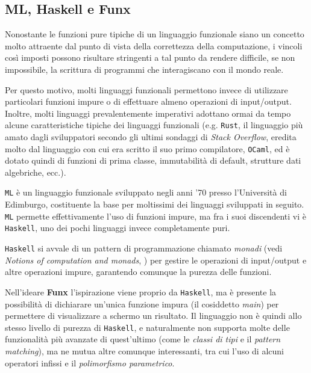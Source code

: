 \subsection{ML, Haskell e Funx}
\label{sec:2-ml-haskell-funx}

Nonostante le funzioni pure tipiche di un linguaggio funzionale siano un concetto molto attraente
dal punto di vista della correttezza della computazione, i vincoli così imposti possono risultare
stringenti a tal punto da rendere difficile, se non impossibile, la scrittura di programmi che
interagiscano con il mondo reale.


Per questo motivo, molti linguaggi funzionali permettono invece di utilizzare particolari funzioni
impure o di effettuare almeno operazioni di input/output. Inoltre, molti linguaggi prevalentemente
imperativi adottano ormai da tempo alcune caratteristiche tipiche dei linguaggi funzionali
(e.g. \texttt{Rust}, il linguaggio più amato dagli sviluppatori secondo gli ultimi sondaggi di \textit{Stack Overflow},
eredita molto dal linguaggio con cui era scritto il suo primo compilatore, \texttt{OCaml}, ed è dotato quindi di
funzioni di prima classe, immutabilità di default, strutture dati algebriche, ecc.).


\texttt{ML} è un linguaggio funzionale sviluppato negli anni '70 presso l'Università di Edimburgo,
costituente la base per moltissimi dei linguaggi sviluppati in seguito.
\texttt{ML} permette effettivamente l'uso di funzioni impure, ma fra i suoi discendenti
vi è \texttt{Haskell}, uno dei pochi linguaggi invece completamente puri.

\noindent \texttt{Haskell} si avvale di un pattern di programmazione chiamato \textit{monadi}
(vedi \textit{Notions of computation and monads}, \cite{NotionsComputationMonads}) per gestire
le operazioni di input/output e altre operazioni impure, garantendo comunque la purezza delle funzioni.


Nell'ideare \textbf{Funx} l'ispirazione viene proprio da \texttt{Haskell}, ma è presente la possibilità
di dichiarare un'unica funzione impura (il cosiddetto \textit{main}) per permettere di visualizzare a schermo un risultato.
Il linguaggio non è quindi allo stesso livello di purezza di \texttt{Haskell}, e naturalmente non supporta
molte delle funzionalità più avanzate di quest'ultimo (come le \textit{classi di tipi} e il \textit{pattern matching}),
ma ne mutua altre comunque interessanti, tra cui l'uso di alcuni operatori infissi e il \textit{polimorfismo parametrico}.